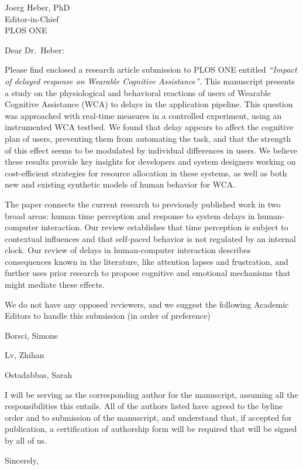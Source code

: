 \documentclass[10pt, letterpaper]{letter}
\begin{document}
\begin{letter}{
    Joerg Heber, PhD\\
    Editor-in-Chief\\
    PLOS ONE
}
\opening{Dear Dr.\ Heber:}

Please find enclosed a research article submission to PLOS ONE entitled \emph{``Impact of delayed response on Wearable Cognitive Assistance''}.
This manuscript presents a study on the physiological and behavioral reactions of users of Wearable Cognitive Assistance (WCA) to delays in the application pipeline.
This question was approached with real-time measures in a controlled experiment, using an instrumented WCA testbed.
We found that delay appears to affect the cognitive plan of users, preventing them from automating the task, and that the strength of this effect seems to be modulated by individual differences in users.
We believe these results provide key insights for developers and system designers working on cost-efficient strategies for resource allocation in these systems, as well as both new and existing synthetic models of human behavior for WCA.\@

The paper connects the current research to previously published work in two broad areas:  human time perception and response to system delays in human-computer interaction.
Our review establishes that time perception is subject to contextual influences and that self-paced behavior is not regulated by an internal clock.
Our review of delays in human-computer interaction describes consequences known in the literature, like attention lapses and frustration, and further uses prior research to propose cognitive and emotional mechanisms that might mediate these effects.

We do not have any opposed reviewers, and we suggest the following Academic Editors to handle this submission (in order of preference)
\begin{enumerate*}[label={(\arabic*)}, before=\unskip{: }, itemjoin={{; }}, itemjoin*={{, and }}]
    \item Borsci, Simone
    \item Lv, Zhihan
    \item Ostadabbas, Sarah 
\end{enumerate*}

I will be serving as the corresponding author for the manuscript, assuming all the responsibilities this entails. 
All of the authors listed have agreed to the byline order and to submission of the manuscript, and understand that, if accepted for publication, a certification of authorship form will be required that will be signed by all of us.

\closing{Sincerely,}

\end{letter}
\end{document}
